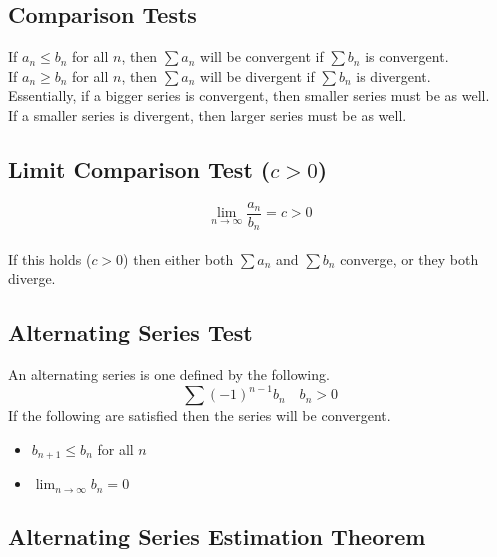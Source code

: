 \documentclass[12pt]{article}
\begin{document}
\subsection{Comparison Tests}

If $a_n \leq b_n$ for all $n$, then $\sum a_n$ will be convergent if $\sum b_n$ is convergent.\\
If $a_n \geq b_n$ for all $n$, then $\sum a_n$ will be divergent if $\sum b_n$ is divergent.\\
Essentially, if a bigger series is convergent, then smaller series must be as well.\\
If a smaller series is divergent, then larger series must be as well.


\subsection{Limit Comparison Test ($c > 0$)}

\begin{displaymath}
\lim_{n\to\infty} \frac{a_n}{b_n} = c > 0
\end{displaymath}
\\
If this holds ($c > 0$) then either both $\sum a_n$ and $\sum b_n$ converge, or they both diverge.


\subsection{Alternating Series Test}

An alternating series is one defined by the following.\\
\begin{displaymath}
\sum (-1)^{n-1} b_n\quad b_n > 0
\end{displaymath}
If the following are satisfied then the series will be convergent.
\begin{itemize}
\item $b_{n+1} \leq b_n$ for all $n$
\item $\lim_{n\to\infty} b_n = 0$
\end{itemize}


\subsection{Alternating Series Estimation Theorem}
\end{document}
